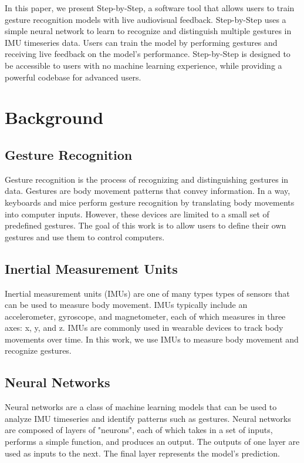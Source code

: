 \documentclass{article}
\begin{document}
In this paper, we present Step-by-Step, a software tool that allows users to train gesture recognition models with live audiovisual feedback. Step-by-Step uses a simple neural network to learn to recognize and distinguish multiple gestures in IMU timeseries data. Users can train the model by performing gestures and receiving live feedback on the model's performance. Step-by-Step is designed to be accessible to users with no machine learning experience, while providing a powerful codebase for advanced users.

\section{Background}
\subsection{Gesture Recognition}
Gesture recognition is the process of recognizing and distinguishing gestures in data. Gestures are body movement patterns that convey information. In a way, keyboards and mice perform gesture recognition by translating body movements into computer inputs. However, these devices are limited to a small set of predefined gestures. The goal of this work is to allow users to define their own gestures and use them to control computers.

\subsection{Inertial Measurement Units}
Inertial measurement units (IMUs) are one of many types types of sensors that can be used to measure body movement. IMUs typically include an accelerometer, gyroscope, and magnetometer, each of which measures in three axes: x, y, and z. IMUs are commonly used in wearable devices to track body movements over time. In this work, we use IMUs to measure body movement and recognize gestures.

\subsection{Neural Networks}
Neural networks are a class of machine learning models that can be used to analyze IMU timeseries and identify patterns such as gestures. Neural networks are composed of layers of "neurons", each of which takes in a set of inputs, performs a simple function, and produces an output. The outputs of one layer are used as inputs to the next. The final layer represents the model's prediction.
\end{document}
